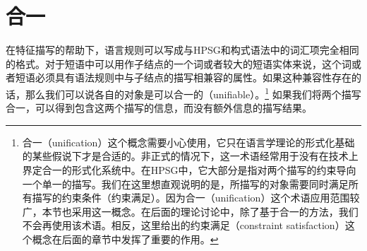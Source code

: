 \section{合一}
\label{sec-unification}

\mbox{}%
在特征描写的帮助下，语言规则可以写成与HPSG和构式语法中的词汇项完全相同的格式。对于短语中可以用作子结点的一个词或者较大的短语实体来说，这个词或者短语必须具有语法规则中与子结点的描写相兼容的属性。如果这种兼容性存在的话，那么我们可以说各自的对象是可以合一的（unifiable）。\footnote{%
  合一（unification）这个概念需要小心使用，它只在语言学理论的形式化基础的某些假说下才是合适的。非正式的情况下，这一术语经常用于没有在技术上界定合一的形式化系统中。在HPSG中，它大部分是指对两个描写的约束导向一个单一的描写。我们在这里想直观说明的是，所描写的对象需要同时满足所有描写的约束条件（约束满足）。因为合一（unification）这个术语应用范围较广，本节也采用这一概念。在后面的理论讨论中，除了基于合一的方法，我们不会再使用该术语。相反，这里给出的约束满足（constraint satisfaction）这个概念在后面的章节中发挥了重要的作用。
}
如果我们将两个描写合一，可以得到包含这两个描写的信息，而没有额外信息的描写结果。

